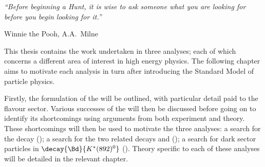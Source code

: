 
\begin{minipage}{\textwidth}
  {\it ``Before beginning a Hunt, it is wise to ask someone what you are looking for before you
  begin looking for it.''}

  {\hfill Winnie the Pooh, A.A.~Milne}
\end{minipage}

\vspace{2em}

This thesis contains the work undertaken in three analyses; each of which concerns a different area
of interest in high energy physics.
The following chapter aims to motivate each analysis in turn after introducing the Standard Model
of particle physics.

Firstly, the formulation of the \sm will be outlined, with particular detail paid to the flavour
sector.
Various successes of the \sm will then be discussed before going on to identify its shortcomings
using arguments from both experiment and theory.
These shortcomings will then be used to motivate the three analyses:
a search for the decay \btodsphi ();
a search for the two related decays \btokpipimumu and \btophikmumu ();
a search for dark sector particles in $\decay{\Bd}{K^*(892)^0}$ ().
Theory specific to each of these analyses will be detailed in the relevant chapter.


